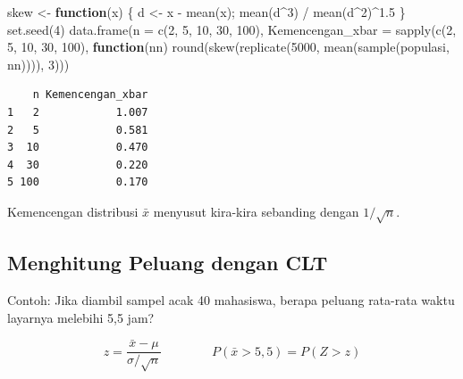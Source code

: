 \documentclass[
  indonesian,
  letterpaper,
]{book}
\newenvironment{Shaded}{\begin{snugshade}}{\end{snugshade}}
\newcommand{\AttributeTok}[1]{\textcolor[rgb]{0.40,0.45,0.13}{#1}}
\newcommand{\ControlFlowTok}[1]{\textcolor[rgb]{0.00,0.23,0.31}{\textbf{#1}}}
\newcommand{\DecValTok}[1]{\textcolor[rgb]{0.68,0.00,0.00}{#1}}
\newcommand{\FloatTok}[1]{\textcolor[rgb]{0.68,0.00,0.00}{#1}}
\newcommand{\FunctionTok}[1]{\textcolor[rgb]{0.28,0.35,0.67}{#1}}
\newcommand{\NormalTok}[1]{\textcolor[rgb]{0.00,0.23,0.31}{#1}}
\newcommand{\OtherTok}[1]{\textcolor[rgb]{0.00,0.23,0.31}{#1}}
\newcommand{\SpecialCharTok}[1]{\textcolor[rgb]{0.37,0.37,0.37}{#1}}
\begin{document}
\begin{Shaded}
\begin{Highlighting}[]
\NormalTok{skew }\OtherTok{\textless{}{-}} \ControlFlowTok{function}\NormalTok{(x) \{ d }\OtherTok{\textless{}{-}}\NormalTok{ x }\SpecialCharTok{{-}} \FunctionTok{mean}\NormalTok{(x); }\FunctionTok{mean}\NormalTok{(d}\SpecialCharTok{\^{}}\DecValTok{3}\NormalTok{) }\SpecialCharTok{/} \FunctionTok{mean}\NormalTok{(d}\SpecialCharTok{\^{}}\DecValTok{2}\NormalTok{)}\SpecialCharTok{\^{}}\FloatTok{1.5}\NormalTok{ \}}
\FunctionTok{set.seed}\NormalTok{(}\DecValTok{4}\NormalTok{)}
\FunctionTok{data.frame}\NormalTok{(}\AttributeTok{n =} \FunctionTok{c}\NormalTok{(}\DecValTok{2}\NormalTok{, }\DecValTok{5}\NormalTok{, }\DecValTok{10}\NormalTok{, }\DecValTok{30}\NormalTok{, }\DecValTok{100}\NormalTok{),}
           \AttributeTok{Kemencengan\_xbar =} \FunctionTok{sapply}\NormalTok{(}\FunctionTok{c}\NormalTok{(}\DecValTok{2}\NormalTok{, }\DecValTok{5}\NormalTok{, }\DecValTok{10}\NormalTok{, }\DecValTok{30}\NormalTok{, }\DecValTok{100}\NormalTok{), }\ControlFlowTok{function}\NormalTok{(nn)}
             \FunctionTok{round}\NormalTok{(}\FunctionTok{skew}\NormalTok{(}\FunctionTok{replicate}\NormalTok{(}\DecValTok{5000}\NormalTok{, }\FunctionTok{mean}\NormalTok{(}\FunctionTok{sample}\NormalTok{(populasi, nn)))), }\DecValTok{3}\NormalTok{)))}
\end{Highlighting}
\end{Shaded}

\begin{verbatim}
    n Kemencengan_xbar
1   2            1.007
2   5            0.581
3  10            0.470
4  30            0.220
5 100            0.170
\end{verbatim}

Kemencengan distribusi \(\bar{x}\) menyusut kira-kira sebanding dengan
\(1/\sqrt{n}\).

\subsection{Menghitung Peluang dengan
CLT}\label{menghitung-peluang-dengan-clt}

Contoh: Jika diambil sampel acak 40 mahasiswa, berapa peluang rata-rata
waktu layarnya melebihi 5,5 jam?

\[z = \frac{\bar{x} - \mu}{\sigma / \sqrt{n}} \qquad\qquad P(\bar{x} > 5{,}5) = P(Z > z)\]
\end{document}
